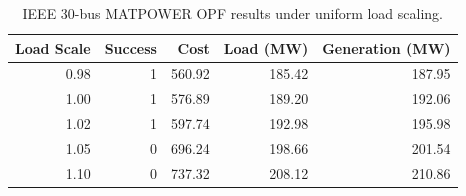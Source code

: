 \begin{table}[t]
  \centering
  \caption{IEEE 30-bus MATPOWER OPF results under uniform load scaling.}
  \label{tab:case30_load_scaling}
  \begin{tabular}{rrrrr}
    \toprule
    \textbf{Load Scale} & \textbf{Success} & \textbf{Cost} & \textbf{Load (MW)} & \textbf{Generation (MW)} \\
    \midrule
    0.98 & 1 & 560.92 & 185.42 & 187.95 \\
    1.00 & 1 & 576.89 & 189.20 & 192.06 \\
    1.02 & 1 & 597.74 & 192.98 & 195.98 \\
    1.05 & 0 & 696.24 & 198.66 & 201.54 \\
    1.10 & 0 & 737.32 & 208.12 & 210.86 \\
    \bottomrule
  \end{tabular}
\end{table}

